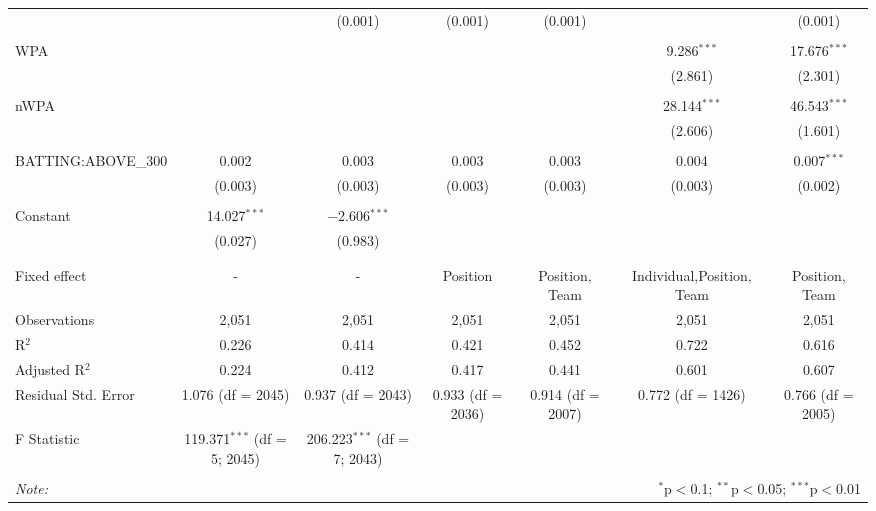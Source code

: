 \begin{table}[!htbp]
\begin{tabular}{@{\extracolsep{5pt}}lcccccc}
  &  & (0.001) & (0.001) & (0.001) &  & (0.001) \\
  & & & & & & \\
 WPA &  &  &  &  & 9.286$^{***}$ & 17.676$^{***}$ \\
  &  &  &  &  & (2.861) & (2.301) \\
  & & & & & & \\
 nWPA &  &  &  &  & 28.144$^{***}$ & 46.543$^{***}$ \\
  &  &  &  &  & (2.606) & (1.601) \\
  & & & & & & \\
 BATTING:ABOVE\_300 & 0.002 & 0.003 & 0.003 & 0.003 & 0.004 & 0.007$^{***}$ \\
  & (0.003) & (0.003) & (0.003) & (0.003) & (0.003) & (0.002) \\
  & & & & & & \\
 Constant & 14.027$^{***}$ & $-$2.606$^{***}$ &  &  &  &  \\
  & (0.027) & (0.983) &  &  &  &  \\
  & & & & & & \\
\hline \\[-1.8ex]
Fixed effect & - & - & Position & Position, Team & Individual,Position, Team & Position, Team \\
Observations & 2,051 & 2,051 & 2,051 & 2,051 & 2,051 & 2,051 \\
R$^{2}$ & 0.226 & 0.414 & 0.421 & 0.452 & 0.722 & 0.616 \\
Adjusted R$^{2}$ & 0.224 & 0.412 & 0.417 & 0.441 & 0.601 & 0.607 \\
Residual Std. Error & 1.076 (df = 2045) & 0.937 (df = 2043) & 0.933 (df = 2036) & 0.914 (df = 2007) & 0.772 (df = 1426) & 0.766 (df = 2005) \\
F Statistic & 119.371$^{***}$ (df = 5; 2045) & 206.223$^{***}$ (df = 7; 2043) &  &  &  &  \\
\hline
\hline \\[-1.8ex]
\textit{Note:}  & \multicolumn{6}{r}{$^{*}$p$<$0.1; $^{**}$p$<$0.05; $^{***}$p$<$0.01} \\
\end{tabular}
\end{table}
